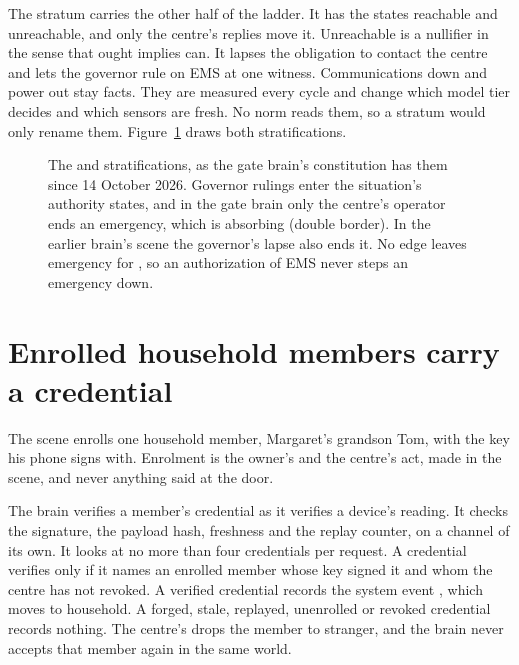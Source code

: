 The stratum  carries the other half of the ladder. It has the states reachable
and unreachable, and only the centre's replies move it. Unreachable is a nullifier in the sense that
ought implies can. It lapses the obligation to contact the centre and lets the governor rule on EMS at
one witness. Communications down and power out stay facts. They are measured every cycle and change
which model tier decides and which sensors are fresh. No norm reads them, so a stratum would only
rename them. Figure~\ref{fig:strata-situation} draws both stratifications.

\begin{figure}[t]
\centering

\caption{The  and  stratifications, as the gate brain's
constitution has them since 14 October 2026. Governor rulings enter the situation's authority states,
and in the gate brain only the centre's operator ends an emergency, which is absorbing (double
border). In the earlier brain's scene the governor's lapse also ends it. No edge leaves emergency for
, so an authorization of EMS never steps an emergency down.}
\label{fig:strata-situation}
\end{figure}

\section{Enrolled household members carry a credential}\label{sec:cont-credentials}

The scene enrolls one household member, Margaret's grandson Tom, with the key his phone signs with.
Enrolment is the owner's and the centre's act, made in the scene, and never anything said at the door.

The brain verifies a member's credential as it verifies a device's reading. It checks the signature,
the payload hash, freshness and the replay counter, on a channel of its own. It looks at no more than
four credentials per request. A credential verifies only if it names an enrolled member whose key
signed it and whom the centre has not revoked. A verified credential records the system event
, which moves  to household. A forged, stale,
replayed, unenrolled or revoked credential records nothing. The centre's 
drops the member to stranger, and the brain never accepts that member again in the same world.

